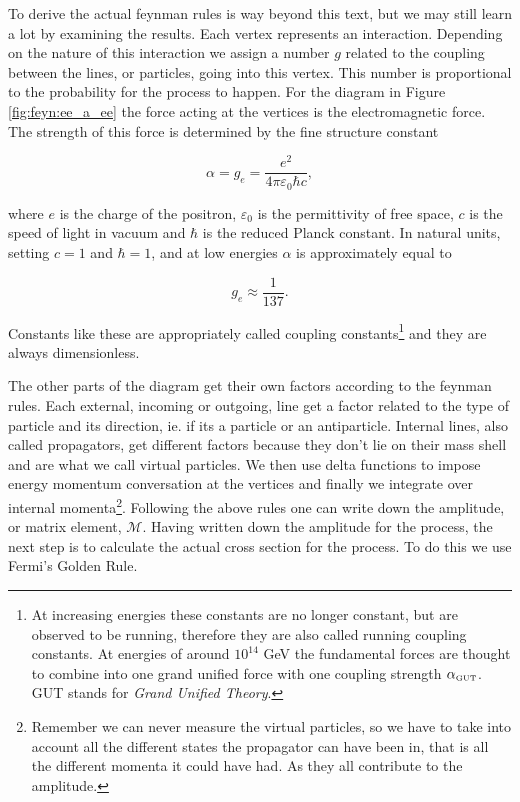 To derive the actual feynman rules is way beyond this text, but we may still learn a lot by examining the results. Each vertex represents an interaction. Depending on the nature of this interaction we assign a number $g$ related to the coupling between the lines, or particles, going into this vertex. This number is proportional to the probability for the process to happen. For the diagram in Figure \ref{fig:feyn:ee_a_ee} the force acting at the vertices is the electromagnetic force. The strength of this force is determined by the fine structure constant 

\begin{equation}
	\alpha = g_e = \frac{e^2}{4\pi\varepsilon_0\hbar c},
\end{equation}

where $e$ is the charge of the positron, $\varepsilon_0$ is the permittivity of free space, $c$ is the speed of light in vacuum and $\hbar$ is the reduced Planck constant. In natural units, setting $c = 1$ and $\hbar = 1$, and at low energies $\alpha$ is approximately equal to

\begin{equation}
	 g_e \approx \frac{1}{137}.
\end{equation}

Constants like these are appropriately called coupling constants\footnote{At increasing energies these constants are no longer constant, but are observed to be running, therefore they are also called running coupling constants. At energies of around $10^{14}$ GeV the fundamental forces are thought to combine into one grand unified force with one coupling strength $\alpha_{\textrm{\tiny{GUT}}}$. GUT stands for \emph{Grand Unified Theory}.} and they are always dimensionless.

The other parts of the diagram get their own factors according to the feynman rules. Each external, incoming or outgoing, line get a factor related to the type of particle and its direction, ie. if its a particle or an antiparticle. Internal lines, also called propagators, get different factors because they don't lie on their mass shell and are what we call virtual particles. We then use delta functions to impose energy momentum conversation at the vertices and finally we integrate over internal momenta\footnote{Remember we can never measure the virtual particles, so we have to take into account all the different states the propagator can have been in, that is all the different momenta it could have had. As they all contribute to the amplitude.}. Following the above rules one can write down the amplitude, or matrix element, $\mathcal{M}$. Having written down the amplitude for the process, the next step is to calculate the actual cross section for the process. To do this we use Fermi's Golden Rule.
% 
